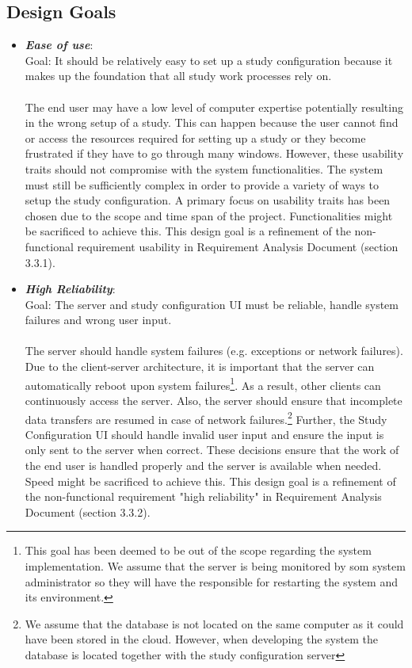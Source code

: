 \subsection{Design Goals}

\begin{itemize}
	\item \textit{\bf{Ease of use}}: 
	\\
	Goal: It should be relatively easy to set up a study configuration because it makes up the foundation that all study work processes rely on. 
	\\\\
	The end user may have a low level of computer expertise potentially resulting in the wrong setup of a study.  This can happen because the user cannot find or access the resources required for setting up a study or they become frustrated if they have to go through many windows. However, these usability traits should not compromise with the system functionalities. The system must still be sufficiently complex in order to provide a variety of ways to setup the study configuration.  A primary focus on usability traits has been chosen due to the scope and time span of the project. Functionalities might be sacrificed to achieve this. This design goal is a refinement of the non-functional requirement  usability in Requirement Analysis Document  (section 3.3.1). 
	
	\item \textit{\bf{High Reliability}}: 
	\\
	Goal: The server and study configuration UI must be reliable, handle system failures and wrong user input.
	\\\\
	The server should handle system failures (e.g. exceptions or network failures). Due to the client-server architecture, it is important that the server can automatically reboot upon system failures\footnote{This goal has been deemed to be out of the scope regarding the system implementation. We assume that the server is being monitored by som system administrator so they will have the responsible for restarting the system and its environment.}. As a result, other clients can continuously access the server. Also, the server should ensure that incomplete data transfers are resumed in case of network failures.\footnote{We assume that the database is not located on the same computer as it could have been stored in the cloud. However, when developing the system the database is located together with the study configuration server} Further, the Study Configuration UI should handle invalid user input and ensure the input is only sent to the server when correct. These decisions ensure that the work of the end user is handled properly and the server is available when needed. Speed might be sacrificed to achieve this. This design goal is a refinement of the non-functional requirement "high reliability" in Requirement Analysis Document (section 3.3.2).  
	

\end{itemize}
